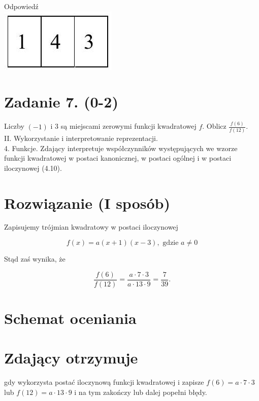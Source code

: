 \documentclass[10pt]{article}
\begin{document}
Odpowiedź\\
\includegraphics[max width=\textwidth, center]{2025_02_07_f5f4e8f37e6baab02e47g-03(1)}

\section*{Zadanie 7. (0-2)}
Liczby $(-1)$ i 3 są miejscami zerowymi funkcji kwadratowej $f$. Oblicz $\frac{f(6)}{f(12)}$.\\
II. Wykorzystanie i interpretowanie reprezentacji.\\
4. Funkcje. Zdający interpretuje współczynników występujących we wzorze funkcji kwadratowej w postaci kanonicznej, w postaci ogólnej i w postaci iloczynowej (4.10).

\section*{Rozwiązanie (I sposób)}
Zapisujemy trójmian kwadratowy w postaci iloczynowej

$$
f(x)=a(x+1)(x-3), \text { gdzie } a \neq 0
$$

Stąd zaś wynika, że

$$
\frac{f(6)}{f(12)}=\frac{a \cdot 7 \cdot 3}{a \cdot 13 \cdot 9}=\frac{7}{39} .
$$

\section*{Schemat oceniania}
\section*{Zdający otrzymuje}
gdy wykorzysta postać iloczynową funkcji kwadratowej i zapisze $f(6)=a \cdot 7 \cdot 3$ lub $f(12)=a \cdot 13 \cdot 9$ i na tym zakończy lub dalej popełni błędy.
\end{document}
